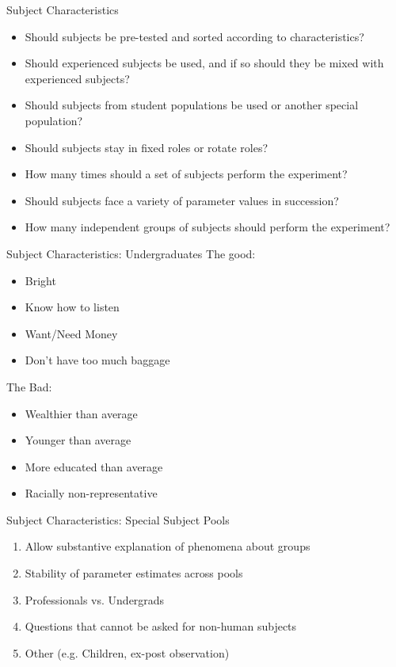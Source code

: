 \documentclass{beamer}
\begin{document}
\begin{frame}{Subject Characteristics}
	\begin{itemize}
		\item Should subjects be pre-tested and sorted according to characteristics?
		\item Should experienced subjects be used, and if so should they be mixed with experienced subjects?
		\item Should subjects from student populations be used or another special population?
		\item Should subjects stay in fixed roles or rotate roles?
		\item How many times should a set of subjects perform the experiment?
		\item Should subjects face a variety of parameter values in succession?
		\item How many independent groups of subjects should perform the experiment?
	\end{itemize}
\end{frame}

\begin{frame}{Subject Characteristics: Undergraduates}
The good:
	\begin{itemize}
		\item Bright
		\item Know how to listen
		\item Want/Need Money
		\item Don't have too much baggage
	\end{itemize}\pause

The Bad:
	\begin{itemize}
		\item Wealthier than average
		\item Younger than average
		\item More educated than average
		\item Racially non-representative
	\end{itemize}
\end{frame}

\begin{frame}{Subject Characteristics: Special Subject Pools}
	\begin{enumerate}
		\item Allow substantive explanation of phenomena about groups
		\item Stability of parameter estimates across pools
		\item Professionals vs. Undergrads
		\item Questions that cannot be asked for non-human subjects
		\item Other (e.g. Children, ex-post observation)
	\end{enumerate}
\end{frame}
\end{document}
